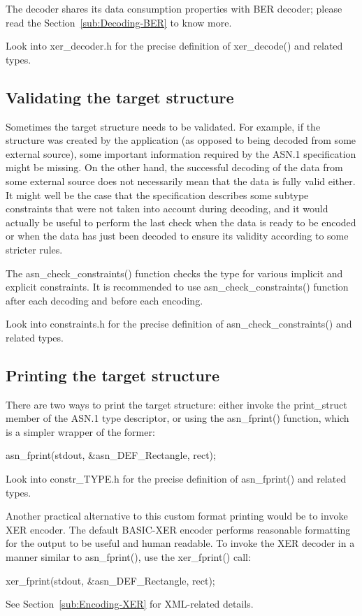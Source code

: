 \documentclass[english,oneside,12pt]{book}
\begin{document}
The decoder shares its data consumption properties with BER decoder;
please read the Section~\ref{sub:Decoding-BER} to know more.

Look into xer\_decoder.h for the precise definition of xer\_decode()
and related types.


\subsection{\label{sub:Validating-the-target}Validating the target structure}

Sometimes the target structure needs to be validated. For example,
if the structure was created by the application (as opposed to being
decoded from some external source), some important information required
by the ASN.1 specification might be missing. On the other hand, the
successful decoding of the data from some external source does not
necessarily mean that the data is fully valid either. It might well
be the case that the specification describes some subtype constraints
that were not taken into account during decoding, and it would actually
be useful to perform the last check when the data is ready to be encoded
or when the data has just been decoded to ensure its validity according
to some stricter rules.

The asn\_check\_constraints() function checks the type for various
implicit and explicit constraints. It is recommended to use asn\_check\_constraints()
function after each decoding and before each encoding.

Look into constraints.h for the precise definition of asn\_check\_constraints()
and related types.


\subsection{\label{sub:Printing-the-target}Printing the target structure}

There are two ways to print the target structure: either invoke the
print\_struct member of the ASN.1 type descriptor, or using the asn\_fprint()
function, which is a simpler wrapper of the former:
\begin{codesample}
asn_fprint(stdout, &asn_DEF_Rectangle, rect);
\end{codesample}
Look into constr\_TYPE.h for the precise definition of asn\_fprint()
and related types.

Another practical alternative to this custom format printing would
be to invoke XER encoder. The default BASIC-XER encoder performs reasonable
formatting for the output to be useful and human readable. To invoke
the XER decoder in a manner similar to asn\_fprint(), use the xer\_fprint()
call:
\begin{codesample}
xer_fprint(stdout, &asn_DEF_Rectangle, rect);
\end{codesample}
See Section~\ref{sub:Encoding-XER} for XML-related details.
\end{document}
